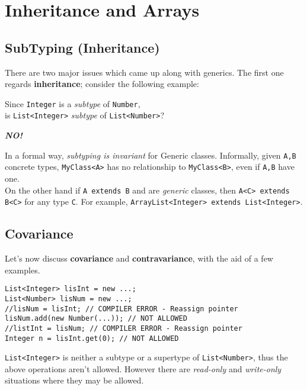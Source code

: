 \section{Inheritance and Arrays}
\subsection{SubTyping (Inheritance)}
There are two major issues which came up along with generics.
The first one regards \textbf{inheritance}; 
consider the following example:
\begin{center}
   Since \lstinline|Integer| is a \textit{subtype} of \lstinline|Number|,\\
   is \lstinline|List<Integer>| \textit{subtype} of \lstinline|List<Number>|?\nl

   {\color{red}\textbf{\textit{NO!}}}
\end{center}
In a formal way, \textit{subtyping is invariant} for Generic classes.
Informally, given \lstinline|A,B| concrete types, \lstinline|MyClass<A>| has no relationship to \lstinline|MyClass<B>|,
even if \lstinline|A,B| have one.\\
On the other hand if \lstinline|A extends B| and are \textit{generic} classes, 
then \lstinline|A<C> extends B<C>| for any type \lstinline|C|.
For example, \lstinline|ArrayList<Integer> extends List<Integer>|.
\nl

\subsection{Covariance}
Let's now discuss \textbf{covariance} and \textbf{contravariance}, with the aid of a few examples.

\begin{lstlisting}
List<Integer> lisInt = new ...;
List<Number> lisNum = new ...;
//lisNum = lisInt; // COMPILER ERROR - Reassign pointer
lisNum.add(new Number(...)); // NOT ALLOWED
//listInt = lisNum; // COMPILER ERROR - Reassign pointer
Integer n = lisInt.get(0); // NOT ALLOWED
\end{lstlisting}

\lstinline|List<Integer>| is neither a subtype or a supertype of \lstinline|List<Number>|,
thus the above operations aren't allowed.
However there are \textit{read-only} and \textit{write-only} situations where they may be allowed.

